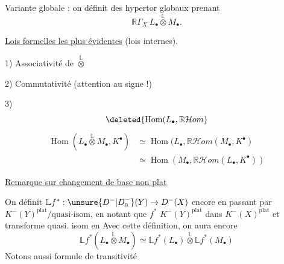 Variante globale : on définit des hypertor globaux  prenant
\[
\mathbb R\Gamma_X\ L_\bullet\overset{\mathbb L}{\otimes}M_\bullet.
\]

\uline{Lois formelles les plus évidentes} (lois internes).

1) Associativité de $\overset{\mathbb L}{\otimes}$

2) Commutativité (attention au signe !)

3) 
\[
\deleted{\operatorname{Hom}(L_\bullet,\mathbb R\mathcal Hom}
\]
\[
\begin{aligned}
\operatorname{Hom}(L_\bullet\overset{\mathbb L}{\otimes}M_\bullet,K^\bullet)&\simeq\operatorname{Hom}(L_\bullet,\mathbb R\mathcal Hom(M_\bullet,K^\bullet)\\
&\simeq\operatorname{Hom}(M_\bullet,\mathbb R\mathcal Hom(L_\bullet,K^\bullet))
\end{aligned}
\]

\uline{Remarque sur changement de base non plat}

On définit $\mathbb Lf^*:\unsure{D^-|D_0^-}(Y)\to D^-(X)$ encore en passant par $K^-(Y)^{\mathrm{plat}}/\text{quasi-isom}$, en notant que $f^*$    $K^-(Y)^{\mathrm{plat}}$ dans $K^-(X)^{\mathrm{plat}}$ et transforme quasi. isom en  Avec cette définition, on aura encore
\[
\mathbb Lf^*(L_\bullet\overset{\mathbb L}{\otimes}M_\bullet)\simeq\mathbb Lf^*(L_\bullet)\overset{\mathbb L}{\otimes}\mathbb Lf^*(M_\bullet)
\]
Notons aussi formule de transitivité
